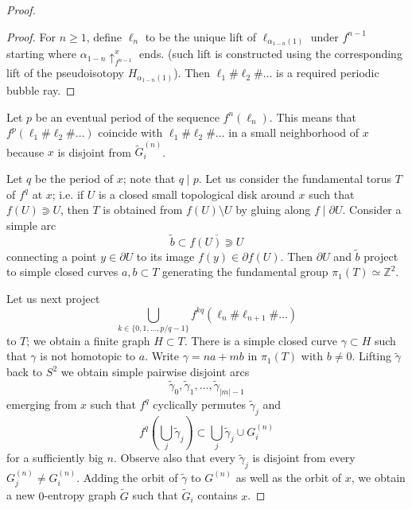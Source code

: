 \documentclass{amsart}
\theoremstyle{plain}
\theoremstyle{definition}
\theoremstyle{remark}
\newcommand{\Z}{{\mathbb Z}}
\newcommand\lift[2]{{\uparrow}_{#1}^{#2}}
\begin{document}
\begin{proof}
\begin{proof}
For $n\ge 1$, define $\ell_n$ to be the unique lift of $\ell_{\alpha_{1-n}(1)}$ under $f^{n-1}$ starting where $\alpha_{1-n} \lift{f^{n-1}}{x}$ ends. (such lift is constructed using the corresponding lift of the pseudoisotopy $H_{\alpha_{1-n} (1)}$).  Then $\ell_1\#\ell_2\#\dots$ is a required periodic bubble ray.
\end{proof}



Let $p$ be an eventual period of the sequence $f^n(\ell_n)$. This means that $f^p(\ell_1\#\ell_2\#\dots )$ coincide with $\ell_1\#\ell_2\#\dots$ in a small neighborhood of $x$ because $x$ is disjoint from $\widetilde G^{(n)}_i$.
  
 Let $q$ be the period of $x$; note that $q\mid p$. Let us consider the fundamental torus $T$ of $f^q$ at $x$; i.e. if $U$ is a closed small topological disk around $x$ such that $f(U)\Supset U$, then $T$ is obtained from $f(U)\setminus U$ by gluing along $f\mid \partial U$. Consider a simple arc \[\widetilde b\subset \overline {f(U)\Supset U}\] connecting a point $y\in \partial U$ to its image $f(y)\in \partial f(U)$. Then $\partial U$ and $\widetilde b$ project to simple closed curves $a,b\subset T$ generating the fundamental group $\pi_1(T)\simeq \Z^2$.
 
 
  
 Let us next project \[\bigcup _{k\in \{0,1,\dots, p/q-1\}} f^{kq}(\ell_n\#\ell_{n+1}\#\dots)\] to $T$; we obtain a finite graph $H\subset T$. There is a simple closed curve $\gamma\subset H$ such that $\gamma$ is not homotopic to $a$. Write $\gamma = na+mb$ in $\pi_1(T)$ with $b\not=0$. Lifting $\widetilde \gamma$ back to $S^2$ we obtain simple pairwise disjoint arcs \[\widetilde \gamma_0,\widetilde\gamma_1,\dots, \widetilde\gamma_{|m|-1}\] emerging from $x$ such that $f^q$ cyclically permutes $\widetilde\gamma_j$ and
   \[f^q\left( \bigcup_j\widetilde\gamma_j\right)\subset  \bigcup_j\widetilde\gamma_j \cup G_i^{(n)}\] for a sufficiently big $n$. Observe also that every $\widetilde \gamma_j$ is disjoint from every $ G_j^{(n)}\not= G_i^{(n)}$.  Adding the orbit of $\widetilde \gamma$ to $G^{(n)}$ as well as the orbit of $x$, we obtain a new $0$-entropy graph $\widetilde G$ such that $\widetilde G_i$ contains $x$.
 
 
 


\end{proof}
\end{document}
